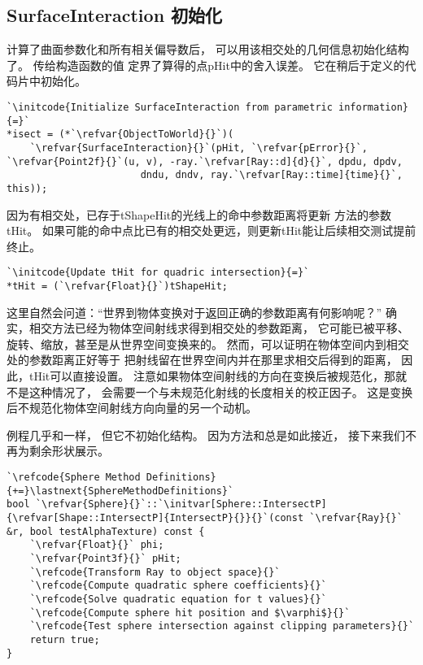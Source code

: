 \subsection{SurfaceInteraction 初始化}
计算了曲面参数化和所有相关偏导数后，
可以用该相交处的几何信息初始化结构了。
传给构造函数的值
定界了算得的点{\ttfamily pHit}中的舍入误差。
它在稍后于定义的代码片中初始化。
\begin{lstlisting}
`\initcode{Initialize SurfaceInteraction from parametric information}{=}`
*isect = (*`\refvar{ObjectToWorld}{}`)(
    `\refvar{SurfaceInteraction}{}`(pHit, `\refvar{pError}{}`, `\refvar{Point2f}{}`(u, v), -ray.`\refvar[Ray::d]{d}{}`, dpdu, dpdv,
                       dndu, dndv, ray.`\refvar[Ray::time]{time}{}`, this));
\end{lstlisting}

因为有相交处，已存于{\ttfamily tShapeHit}的光线上的命中参数距离将更新
方法的参数{\ttfamily tHit}。
如果可能的命中点比已有的相交处更远，则更新{\ttfamily *tHit}能让后续相交测试提前终止。
\begin{lstlisting}
`\initcode{Update tHit for quadric intersection}{=}`
*tHit = (`\refvar{Float}{}`)tShapeHit;
\end{lstlisting}

这里自然会问道：“世界到物体变换对于返回正确的参数距离有何影响呢？”
确实，相交方法已经为物体空间射线求得到相交处的参数距离，
它可能已被平移、旋转、缩放，甚至是从世界空间变换来的。
然而，可以证明在物体空间内到相交处的参数距离正好等于
把射线留在世界空间内并在那里求相交后得到的距离，
因此，{\ttfamily *tHit}可以直接设置。
注意如果物体空间射线的方向在变换后被规范化，那就不是这种情况了，
会需要一个与未规范化射线的长度相关的校正因子。
这是变换后不规范化物体空间射线方向向量的另一个动机。

例程几乎和一样，
但它不初始化结构。
因为方法和总是如此接近，
接下来我们不再为剩余形状展示。
\begin{lstlisting}
`\refcode{Sphere Method Definitions}{+=}\lastnext{SphereMethodDefinitions}`
bool `\refvar{Sphere}{}`::`\initvar[Sphere::IntersectP]{\refvar[Shape::IntersectP]{IntersectP}{}}{}`(const `\refvar{Ray}{}` &r, bool testAlphaTexture) const {
    `\refvar{Float}{}` phi;
    `\refvar{Point3f}{}` pHit;
    `\refcode{Transform Ray to object space}{}`
    `\refcode{Compute quadratic sphere coefficients}{}`
    `\refcode{Solve quadratic equation for t values}{}`
    `\refcode{Compute sphere hit position and $\varphi$}{}`
    `\refcode{Test sphere intersection against clipping parameters}{}`
    return true;
}
\end{lstlisting}

